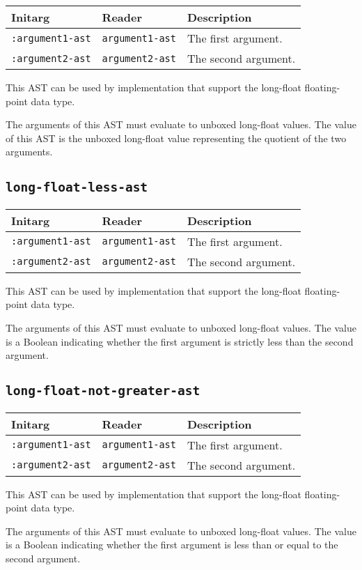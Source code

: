 \begin{tabular}{|l|l|l|}
\hline
Initarg & Reader & Description\\
\hline\hline
\texttt{:argument1-ast} & \texttt{argument1-ast} & The first argument.\\
\hline
\texttt{:argument2-ast} & \texttt{argument2-ast} & The second argument.\\
\hline
\end{tabular}

This AST can be used by implementation that support the long-float
floating-point data type.  

The arguments of this AST must evaluate to unboxed long-float
values.  The value of this AST is the unboxed long-float value
representing the quotient of the two arguments.

\subsection{\texttt{long-float-less-ast}}
\label{sec-ast-long-float-less}

\begin{tabular}{|l|l|l|}
\hline
Initarg & Reader & Description\\
\hline\hline
\texttt{:argument1-ast} & \texttt{argument1-ast} & The first argument.\\
\hline
\texttt{:argument2-ast} & \texttt{argument2-ast} & The second argument.\\
\hline
\end{tabular}

This AST can be used by implementation that support the long-float
floating-point data type.  

The arguments of this AST must evaluate to unboxed long-float
values.  The value is a Boolean indicating whether the first argument
is strictly less than the second argument.

\subsection{\texttt{long-float-not-greater-ast}}
\label{sec-ast-long-float-not-greater}

\begin{tabular}{|l|l|l|}
\hline
Initarg & Reader & Description\\
\hline\hline
\texttt{:argument1-ast} & \texttt{argument1-ast} & The first argument.\\
\hline
\texttt{:argument2-ast} & \texttt{argument2-ast} & The second argument.\\
\hline
\end{tabular}

This AST can be used by implementation that support the long-float
floating-point data type.  

The arguments of this AST must evaluate to unboxed long-float
values.  The value is a Boolean indicating whether the first argument
is less than or equal to the second argument.
